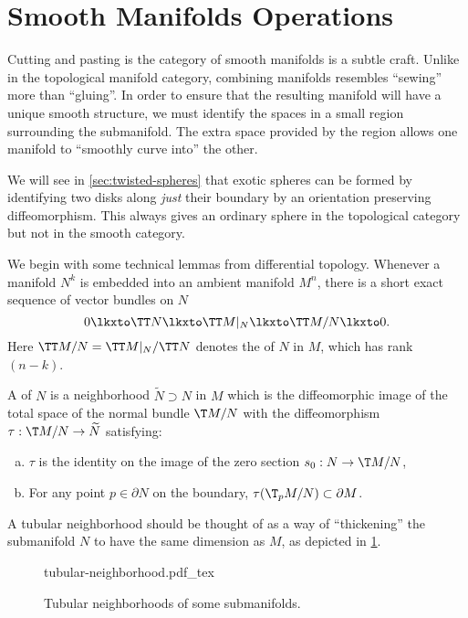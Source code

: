\pagebreak
\section{Smooth Manifolds Operations}\label{sec:smooth-manifold-operations}

Cutting and pasting is the category of smooth manifolds is a subtle craft. 
Unlike in the topological manifold category, combining manifolds resembles ``sewing'' more than ``gluing''. In order to ensure that the resulting manifold will have a unique smooth structure, we must identify the spaces in a small region surrounding the submanifold. The extra space provided by the region allows one manifold to ``smoothly curve into'' the other.

\begin{remark} 
	We will see in \cref{sec:twisted-spheres} that exotic spheres can be formed by identifying two disks along \emph{just} their boundary by an orientation preserving diffeomorphism. This always gives an ordinary sphere in the topological category but not in the smooth category.
\end{remark}

We begin with some technical lemmas from differential topology. Whenever a manifold $N^k$ is embedded into an ambient manifold $M^n$, there is a short exact sequence of vector bundles on $N$
\begin{equation}
	0 \lkxto \TT N\lkxto \TT M|_N \lkxto \TT M/N \lkxto 0.
\end{equation}
Here $\TT M/N=\TT M|_N / \TT N$ denotes the  of $N$ in $M$, which has rank $(n-k)$.

A  of $N$ is a neighborhood $\widetilde{N}\supset N$ in $M$ which is the diffeomorphic image of the total space of the normal bundle $\T M/N$ with the diffeomorphism $\tau : \T M/N \to \widetilde{N}$ satisfying:
\begin{enumerate}[(a)]
	\item $\tau$ is the identity on the image of the zero section $s_0 : N \to \T M/N$,
	\item For any point $p\in \partial N$ on the boundary, $\tau(\T_p M/N)\subset \partial M$.
\end{enumerate}


A tubular neighborhood should be thought of as a way of ``thickening'' the submanifold $N$ to have the same dimension as $M$, as depicted in \cref{fig:tubular-neighborhood}. 

\begin{figure}[ht]
	\centering
	{tubular-neighborhood.pdf_tex}
	\caption{Tubular neighborhoods of some submanifolds.}\label{fig:tubular-neighborhood}
\end{figure}

